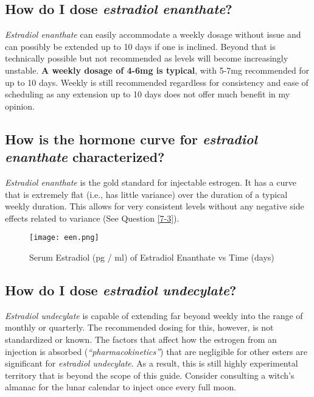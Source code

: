 \documentclass{article}
\begin{document}
\subsection{How do I dose \textit{estradiol enanthate}?}

\textit{Estradiol enanthate} can easily accommodate a weekly dosage without issue and can possibly be extended up to 10 days if one is inclined. Beyond that is technically possible but not recommended as levels will become increasingly unstable. \textbf{A weekly dosage of 4-6mg is typical}, with 5-7mg recommended for up to 10 days. Weekly is still recommended regardless for consistency and ease of scheduling as any extension up to 10 days does not offer much benefit in my opinion.

\subsection{How is the hormone curve for \textit{estradiol enanthate} characterized?}

\textit{Estradiol enanthate} is the gold standard for injectable estrogen. It has a curve that is extremely flat (i.e., has little variance) over the duration of a typical weekly duration. This allows for very consistent levels without any negative side effects related to variance (See Question \ref{7-3}).

 \begin{figure}[H]
     \centering
     \texttt{[image: een.png]}
     \caption{Serum Estradiol (pg / ml) of Estradiol Enanthate vs Time (days) }
     \label{fig:een}
 \end{figure}

\subsection{How do I dose\textit{ estradiol undecylate}?}

\textit{Estradiol undecylate} is capable of extending far beyond weekly into the range of monthly or quarterly. The recommended dosing for this, however, is not standardized or known. The factors that affect how the estrogen from an injection is absorbed (\textit{“pharmacokinetics”}) that are negligible for other esters are significant for \textit{estradiol undecylate}. As a result, this is still highly experimental territory that is beyond the scope of this guide. Consider consulting a witch’s almanac for the lunar calendar to inject once every full moon.
\end{document}
